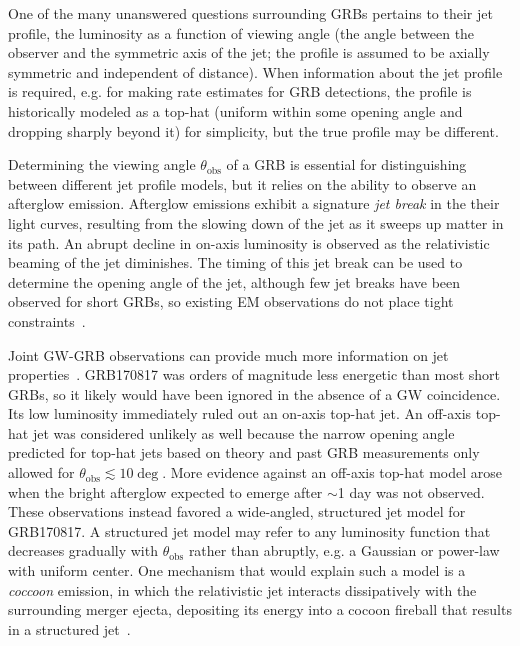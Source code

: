 One of the many unanswered questions surrounding \acp{GRB} pertains to their jet profile, the luminosity as a function of viewing angle (the angle between the observer and the symmetric axis of the jet; the profile is assumed to be axially symmetric and independent of distance).
When information about the jet profile is required, e.g. for making rate estimates for \ac{GRB} detections, the profile is historically modeled as a top-hat (uniform within some opening angle and dropping sharply beyond it) for simplicity, but the true profile may be different.

Determining the viewing angle $\theta_{\mathrm{obs}}$ of a \ac{GRB} is essential for distinguishing between different jet profile models, but it relies on the ability to observe an afterglow emission.
Afterglow emissions exhibit a signature \textit{jet break} in the their light curves, resulting from the slowing down of the jet as it sweeps up matter in its path.
An abrupt decline in on-axis luminosity is observed as the relativistic beaming of the jet diminishes.
The timing of this jet break can be used to determine the opening angle of the jet, although few jet breaks have been observed for short \acp{GRB}, so existing EM observations do not place tight constraints~\citep{Biscoveanu_2020}.

Joint GW-GRB observations can provide much more information on jet properties~\citep{Mogushi_2019, Farah_2020}.
GRB170817 was orders of magnitude less energetic than most short \acp{GRB}, so it likely would have been ignored in the absence of a \ac{GW} coincidence.
Its low luminosity immediately ruled out an on-axis top-hat jet.
An off-axis top-hat jet was considered unlikely as well because the narrow opening angle predicted for top-hat jets based on theory and past \ac{GRB} measurements only allowed for $\theta_{\mathrm{obs}} \lesssim 10\deg$.
More evidence against an off-axis top-hat model arose when the bright afterglow expected to emerge after $\sim$1 day was not observed.
These observations instead favored a wide-angled, structured jet model for GRB170817.
A structured jet model may refer to any luminosity function that decreases gradually with $\theta_{\mathrm{obs}}$ rather than abruptly, e.g. a Gaussian or power-law with uniform center.
One mechanism that would explain such a model is a \textit{coccoon} emission, in which the relativistic jet interacts dissipatively with the surrounding merger ejecta, depositing its energy into a cocoon fireball that results in a structured jet~\citep{gw170817_grb}.

